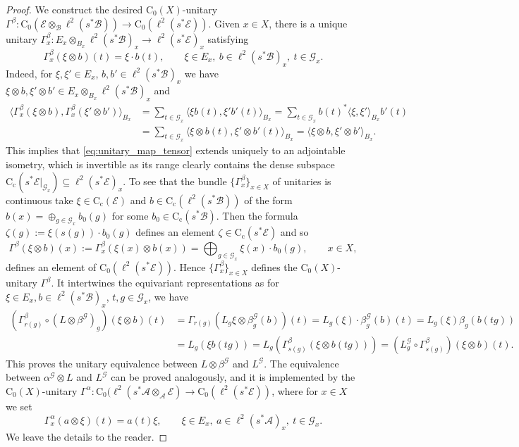 \documentclass[11 pt, leqno]{amsart}
\numberwithin{equation}{section}
\theoremstyle{plain}
\theoremstyle{definition}
\newcommand*{\contc}{\mathrm{C_c}}%
\newcommand*{\contz}{\mathrm{C_0}}%
\newcommand{\B}{\mathcal B}
\newcommand{\G}{\mathcal G} %
\newcommand{\EE}{\mathcal E}
\newcommand{\A}{\mathcal A}
\begin{document}
\begin{proof} 
We construct the desired $\contz(X)$-unitary $\Gamma^{\beta} : \contz(\EE \otimes_\B \ell^2(s^*\B)) \to \contz(\ell^2(s^*\EE))$. 
Given $x \in X$, there is a unique unitary $\Gamma_x^{\beta} : E_x \otimes_{B_x} \ell^2(s^*\B)_x\to \ell^2(s^*\EE)_x$ satisfying
\begin{equation}\label{eq:unitary_map_tensor} 
    \Gamma_x^{\beta}(\xi \otimes b)(t) =\xi \cdot b (t), \qquad \xi \in E_x, \ b \in \ell^2(s^*\B)_x ,\ t \in \G_x.
\end{equation}
Indeed, for $\xi, \xi' \in E_x$, $b, b' \in \ell^2(s^*\B)_x$ we have  $\xi \otimes b, \xi' \otimes b'\in E_x \otimes_{B_x} \ell^2(s^*\B)_x$ and
\[
\begin{split}
    \langle \Gamma_x^{\beta}(\xi \otimes b), \Gamma_x^{\beta}(\xi' \otimes b')\rangle_{B_{x}} &=\sum_{t \in \G_x} \langle\xi b(t),  \xi'b'(t)\rangle_{B_x} = \sum_{t \in \G_x} b(t)^*\langle\xi , \xi'\rangle_{B_x} b'(t) \\
        &= \sum_{t \in \G_x}  \langle \xi \otimes b(t), \xi' \otimes b'(t) \rangle_{B_x} = \langle \xi \otimes b, \xi' \otimes b'\rangle_{B_x} . 
\end{split}
\]
This implies that \eqref{eq:unitary_map_tensor} extends uniquely to an adjointable isometry, which is invertible as its range clearly contains the dense subspace $\contc(s^*\EE|_{\G_x})\subseteq  \ell^2(s^*\EE)_x$. 
To see that the bundle $\{\Gamma_x^{\beta}\}_{x\in X}$ of unitaries is continuous take $\xi\in \contc(\EE)$ and $b\in \contc( \ell^{2}(s^*\B))$ of the form $b(x)=\oplus_{g\in \G_x} b_0(g)$ for some $b_0\in \contc( s^*\B)$. 
Then the formula $\zeta(g):=\xi(s(g))\cdot b_0(g)$ defines an element $\zeta \in\contc( s^*\EE)$ and so
\[
    \Gamma^{\beta}(\xi\otimes b)(x) := \Gamma_x^{\beta}(\xi(x)\otimes b(x))= \bigoplus_{g\in \G_x} \xi(x)\cdot b_0(g), \qquad x \in X, 
\]
defines an element of $\contz(\ell^{2}(s^*\EE))$. 
Hence $\{\Gamma_x^{\beta}\}_{x\in X}$ defines the $\contz(X)$-unitary $\Gamma^{\beta}$. 
It intertwines the equivariant representations as for $\xi \in E_x, b \in \ell^2(s^*\B)_x$, $t,g \in \G_x$, we have
\[
\begin{split} 
    (\Gamma_{r(g)}^{\beta}  \circ (L \otimes \beta^\G)_g) (\xi \otimes b)(t) &= \Gamma_{r(g)} (L_g \xi \otimes \beta^\G_g(b))(t) = L_{g} (\xi)\cdot  \beta^\G_g(b)(t ) = L_g (\xi) \beta_g (b (t g)) \\
        &= L_g (\xi b (tg)) = L_g (\Gamma_{s(g)}^{\beta} (\xi \otimes b (tg)))=(L^{\G}_{g} \circ \Gamma_{s(g)}^{\beta}) (\xi \otimes b)(t).
\end{split}
\]
This proves the unitary equivalence between $L \otimes \beta^\G$ and $L^\G$. 
The equivalence between $\alpha^\G \otimes L$ and $L^\G$ can be proved analogously, and it is implemented by the $\contz(X)$-unitary $\Gamma^{\alpha}:\contz(\ell^2(s^*\A \otimes_{\A} \EE ) \to \contz(\ell^2(s^*\EE))$, where for $x \in X$ we set
\[ 
    \Gamma_x^{\alpha}(a \otimes\xi)(t) = a(t) \xi, \qquad \xi \in E_x ,\ a \in \ell^2(s^*\A)_x ,\ t \in \G_x.
\]
We leave the details to the reader. 
\end{proof}
\end{document}
